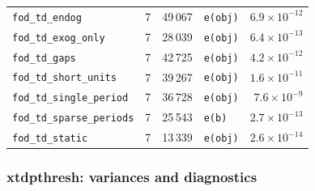 \documentclass[
  10.5pt,
  a4paper,
]{article}
\begin{document}
\begin{longtable}{@{}p{3.6cm}rrp{4.9cm}r@{}}
\texttt{fod\_\allowbreak{}td\_\allowbreak{}endog} & 7 & 49\,067 & \texttt{e(obj)} & $6.9\times10^{-12}$ \\
\texttt{fod\_\allowbreak{}td\_\allowbreak{}exog\_\allowbreak{}only} & 7 & 28\,039 & \texttt{e(obj)} & $6.4\times10^{-13}$ \\
\texttt{fod\_\allowbreak{}td\_\allowbreak{}gaps} & 7 & 42\,725 & \texttt{e(obj)} & $4.2\times10^{-12}$ \\
\texttt{fod\_\allowbreak{}td\_\allowbreak{}short\_\allowbreak{}units} & 7 & 39\,267 & \texttt{e(obj)} & $1.6\times10^{-11}$ \\
\texttt{fod\_\allowbreak{}td\_\allowbreak{}single\_\allowbreak{}period} & 7 & 36\,728 & \texttt{e(obj)} & $7.6\times10^{-9}$ \\
\texttt{fod\_\allowbreak{}td\_\allowbreak{}sparse\_\allowbreak{}periods} & 7 & 25\,543 & \texttt{e(b)} & $2.7\times10^{-13}$ \\
\texttt{fod\_\allowbreak{}td\_\allowbreak{}static} & 7 & 13\,339 & \texttt{e(obj)} & $2.6\times10^{-14}$ \\
\bottomrule
\end{longtable}

\subsubsection*{xtdpthresh: variances and diagnostics}
\end{document}
